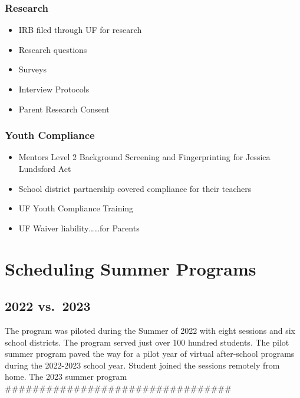 \documentclass[
]{article}
\providecommand{\tightlist}{%
  \setlength{\itemsep}{0pt}\setlength{\parskip}{0pt}}
\begin{document}
\hypertarget{research}{%
\subsubsection{Research}\label{research}}

\begin{itemize}
\tightlist
\item
  IRB filed through UF for research
\item
  Research questions
\item
  Surveys
\item
  Interview Protocols
\item
  Parent Research Consent
\end{itemize}

\hypertarget{youth-compliance}{%
\subsubsection{Youth Compliance}\label{youth-compliance}}

\begin{itemize}
\tightlist
\item
  Mentors Level 2 Background Screening and Fingerprinting for Jessica
  Lundsford Act
\item
  School district partnership covered compliance for their teachers
\item
  UF Youth Compliance Training
\item
  UF Waiver liability\ldots\ldots for Parents
\end{itemize}

\hypertarget{scheduling-summer-programs}{%
\section{Scheduling Summer Programs}\label{scheduling-summer-programs}}

\hypertarget{vs.-2023}{%
\subsection{2022 vs.~2023}\label{vs.-2023}}

The program was piloted during the Summer of 2022 with eight sessions
and six school districts. The program served just over 100 hundred
students. The pilot summer program paved the way for a pilot year of
virtual after-school programs during the 2022-2023 school year. Student
joined the sessions remotely from home. The 2023 summer program
\#\#\#\#\#\#\#\#\#\#\#\#\#\#\#\#\#\#\#\#\#\#\#\#\#\#\#\#\#\#\#\#\#
\end{document}
